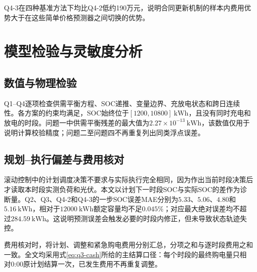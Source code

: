 \documentclass[UTF8,12pt,a4paper]{ctexart}
\theoremstyle{remark}
\begin{document}
Q4-3在四种基准方法下均比Q4-2低约190万元，说明合同更新机制的样本内费用优势大于在这些简单价格预测器之间切换的优势。

\section{模型检验与灵敏度分析}
\subsection{数值与物理检验}
Q1--Q4逐项检查供需平衡方程、SOC递推、变量边界、充放电状态和跨日连续性。各方案的约束均满足，SOC始终位于$[1200,10800]\ \mathrm{kWh}$，且没有同时充电和放电的时段。问题一中供需平衡残差的最大值为$2.27\times10^{-13}\ \mathrm{kWh}$，该数值仅用于说明计算校验精度；问题二至问题四不再重复列出同类浮点误差。

\subsection{规划--执行偏差与费用核对}
滚动控制中的计划调度决策不要求与实际执行完全相同，因为作出当前时段决策后才读取本时段实测负荷和光伏。本文以计划下一时段SOC与实际SOC的差作为诊断量。Q2、Q3、Q4-2和Q4-3的一步SOC误差MAE分别为$5.33$、$5.06$、$4.80$和$5.16\ \mathrm{kWh}$，相对于$12000\ \mathrm{kWh}$额定容量均不足$0.045\%$；对应最大绝对误差均不超过$284.59\ \mathrm{kWh}$。这说明预测误差会触发必要的时段内修正，但未导致状态轨迹失控。

费用核对时，将计划、调整和紧急购电费用分别汇总，分项之和与逐时段费用之和一致。全文均采用式\eqref{eq:q3-cash}所给的主结算口径：每个时段的最终购电量只相对0:00原计划结算一次，已发生费用不再重复调整。
\end{document}
